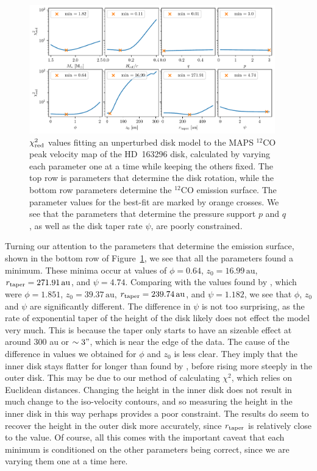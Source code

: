 \begin{figure}
    \centering
    \includegraphics[width = 0.95\textwidth]{figures/chi_sq_background_hd163.pdf}
    \caption{$\chi_{\rm red}^2$ values fitting an unperturbed disk model to the MAPS $^{12}$CO peak velocity map of the HD~163296 disk, calculated by varying each parameter one at a time while keeping the others fixed. The top row is parameters that determine the disk rotation, while the bottom row parameters determine the $^{12}$CO emission surface. The parameter values for the best-fit are marked by orange crosses. We see that the parameters that determine the pressure support $p$ and $q$, as well as the disk taper rate $\psi$, are poorly constrained.}
    \label{fig:grid_chisq_background}
\end{figure}

Turning our attention to the parameters that determine the emission surface, shown in the bottom row of Figure~\ref{fig:grid_chisq_background}, we see that all the parameters found a minimum.
These minima occur at values of $\phi = 0.64$, $z_0 = 16.99 \, \mathrm{au}$, $r_{\rm taper} = 271.91 \, \mathrm{au}$, and $\psi = 4.74$.
Comparing with the values found by \citet{law2021a}, which were $\phi = 1.851$, $z_0 = 39.37 \, \mathrm{au}$, $r_{\rm taper} = 239.74 \, \mathrm{au}$, and $\psi = 1.182$, we see that $\phi$, $z_0$ and $\psi$ are significantly different.
The difference in $\psi$ is not too surprising, as the rate of exponential taper of the height of the disk likely does not effect the model very much.
This is because the taper only starts to have an sizeable effect at around $300$ au or $\sim3"$, which is near the edge of the data.
The cause of the difference in values we obtained for $\phi$ and $z_0$ is less clear.
They imply that the inner disk stays flatter for longer than found by \citet{law2021a}, before rising more steeply in the outer disk.
This may be due to our method of calculating $\chi^2$, which relies on Euclidean distances.
Changing the height in the inner disk does not result in much change to the iso-velocity contours, and so measuring the height in the inner disk in this way perhaps provides a poor constraint.
The results do seem to recover the height in the outer disk more accurately, since $r_{\rm taper}$ is relatively close to the \citet{law2021a} value.
Of course, all this comes with the important caveat that each minimum is conditioned on the other parameters being correct, since we are varying them one at a time here.

